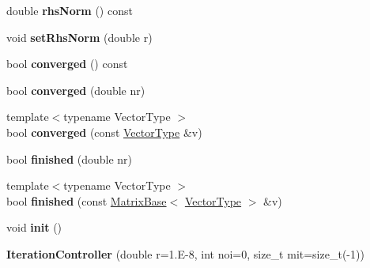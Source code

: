 \begin{DoxyCompactItemize}
double {\bfseries rhs\+Norm} () const
\item 
\mbox{\label{class_eigen_1_1_iteration_controller_a4aa73982fdd3a0549c4b04464e0f031c}} 
void {\bfseries set\+Rhs\+Norm} (double r)
\item 
\mbox{\label{class_eigen_1_1_iteration_controller_a723ae9cb3788b7fb34697b1f62741716}} 
bool {\bfseries converged} () const
\item 
\mbox{\label{class_eigen_1_1_iteration_controller_abd2f4666cc76e8afcd241eb482cb21e5}} 
bool {\bfseries converged} (double nr)
\item 
\mbox{\label{class_eigen_1_1_iteration_controller_a033e0322b6e5ad935388316cb1df95dc}} 
{\footnotesize template$<$typename Vector\+Type $>$ }\\bool {\bfseries converged} (const \hyperlink{struct_vector_type}{Vector\+Type} \&v)
\item 
\mbox{\label{class_eigen_1_1_iteration_controller_af58f849ee9625eeb99749478f17eb44b}} 
bool {\bfseries finished} (double nr)
\item 
\mbox{\label{class_eigen_1_1_iteration_controller_aa43c7653d26cdec6e6f4597e18bca1df}} 
{\footnotesize template$<$typename Vector\+Type $>$ }\\bool {\bfseries finished} (const \hyperlink{group___core___module_class_eigen_1_1_matrix_base}{Matrix\+Base}$<$ \hyperlink{struct_vector_type}{Vector\+Type} $>$ \&v)
\item 
\mbox{\label{class_eigen_1_1_iteration_controller_a192cc7f73d6595d169f0ba09d4296cda}} 
void {\bfseries init} ()
\item 
\mbox{\label{class_eigen_1_1_iteration_controller_a85385eecf35223c3ea985d0cea1b33ae}} 
{\bfseries Iteration\+Controller} (double r=1.\+E-\/8, int noi=0, size\+\_\+t mit=size\+\_\+t(-\/1))
\item 
\mbox{\label{class_eigen_1_1_iteration_controller_a89f3f6d2826e8e3a462a62c297c8d139}} 

\end{DoxyCompactItemize}
